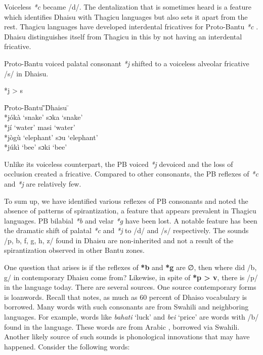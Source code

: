 \documentclass[output=paper,colorlinks,citecolor=brown]{langscibook}
\begin{document}
Voiceless \textit{*c} became /d/. The dentalization that is sometimes heard is a feature which identifies Dhaisu with Thagicu languages but also sets it apart from the rest. Thagicu languages have developed interdental fricatives for Proto-Bantu \textit{*c }\citep{Nurse1982}. Dhaisu distinguishes itself from Thagicu in this by not having an interdental fricative. 

Proto-Bantu voiced palatal consonant \textit{*j}  shifted to a voiceless alveolar fricative /s/ in Dhaisu.

\ea%
    \label{ex:ngonyani:10}
    *j > s\\
	\begin{tabbing} 
        \= Proto-Bantu \quad\= \quad\= \quad\= \quad\= \quad\= \quad\= \quad\= Dhaisu \quad\=  \quad\= \\
        \>  *jókà
        \> ‘snake’
        \> \> \>  \> \> \> sɔka
        \> ‘snake’\\
        
        \> *jí
        \> ‘water’
        \> \> \>  \> \> \> masi
        \> ‘water’\\
        
        \> *jògù
        \> ‘elephant’
        \> \> \>  \> \> \> sɔu
        \> ‘elephant’\\
        
        \> *júkì
        \> ‘bee’
        \> \> \>  \> \> \> sɔki
        \> ‘bee’
    \end{tabbing}
\z

Unlike its voiceless counterpart, the PB voiced \textit{*j} devoiced and the loss of occlusion  created a fricative. Compared to other consonants, the PB reflexes of \textit{*c} and \textit{*j} are relatively few.

To sum up, we have identified various reflexes of PB consonants and noted the absence of patterns of spirantization, a feature that appears prevalent in Thagicu languages. PB bilabial \textit{*b} and velar \textit{*g}  have been lost. A notable feature has been the dramatic shift of palatal \textit{*c }and \textit{*j} to /d/ and /s/ respectively. The sounds /p, b, f, g, h, z/ found in Dhaisu are non-inherited \citep{Nurse2000}  and not a result of the spirantization observed in other Bantu zones. 
     
One question that arises is if the reflexes of \textbf{*b} and \textbf{*g} are ∅, then where did /b, g/ in contemporary Dhaisu come from? Likewise, in spite of \textbf{*p > v}, there is /p/ in the language today. There are several sources. One source contemporary forms is loanwords. Recall that \cite[20]{Nurse2000} notes, as much as 60 percent of Dhaiso vocabulary is borrowed. Many words with such consonants are from Swahili and neighboring languages. For example, words like \textit{bahati }‘luck’ and \textit{bei} ‘price’ are words with /b/ found in the language. These words are from Arabic \citep{TUKI1996}, borrowed via Swahili. Another likely source of such sounds is phonological innovations that may have happened. Consider the following words:
\end{document}
